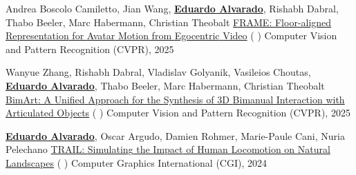 
\begin{cventries}

\cvpublication
    {Andrea Boscolo Camiletto, Jian Wang, \textbf{\underline{Eduardo Alvarado}}, Rishabh Dabral, Thabo Beeler, Marc Habermann, Christian Theobalt} %
    {\href{https://vcai.mpi-inf.mpg.de/projects/FRAME/} {FRAME: {Floor}-aligned {Representation} for {Avatar} {Motion} from {Egocentric} {Video}} (\href{https://github.com/abcamiletto/frame}{} \href{https://vcai.mpi-inf.mpg.de/projects/FRAME/}{} \href{https://vcai.mpi-inf.mpg.de/projects/FRAME/}{})} %
    {Computer Vision and Pattern Recognition (CVPR), 2025} %

\cvpublication
    {Wanyue Zhang, Rishabh Dabral, Vladislav Golyanik, Vasileios Choutas, \textbf{\underline{Eduardo Alvarado}}, Thabo Beeler, Marc Habermann, Christian Theobalt} %
    {\href{https://vcai.mpi-inf.mpg.de/projects/bimart/} {BimArt: A {Unified} {Approach} for the {Synthesis} of {3D} {Bimanual} {Interaction} with {Articulated} {Objects}} (\href{https://vcai.mpi-inf.mpg.de/projects/bimart/}{} \href{https://arxiv.org/pdf/2412.05066}{} \href{https://vcai.mpi-inf.mpg.de/projects/bimart/}{})} %
    {Computer Vision and Pattern Recognition (CVPR), 2025} %

\cvpublication
    {\textbf{\underline{Eduardo Alvarado}}, Oscar Argudo, Damien Rohmer, Marie-Paule Cani, Nuria Pelechano} %
    {\href{https://link.springer.com/article/10.1007/s00371-024-03506-z} {TRAIL: {Simulating} the {Impact} of {Human} {Locomotion} on {Natural} {Landscapes}} (\href{https://github.com/edualvarado/TRAIL-Natural-Impact}{} \href{https://link.springer.com/article/10.1007/s00371-024-03506-z}{} \href{https://link.springer.com/article/10.1007/s00371-024-03506-z}{})} %
    {Computer Graphics International (CGI), 2024} %


\end{cventries}

